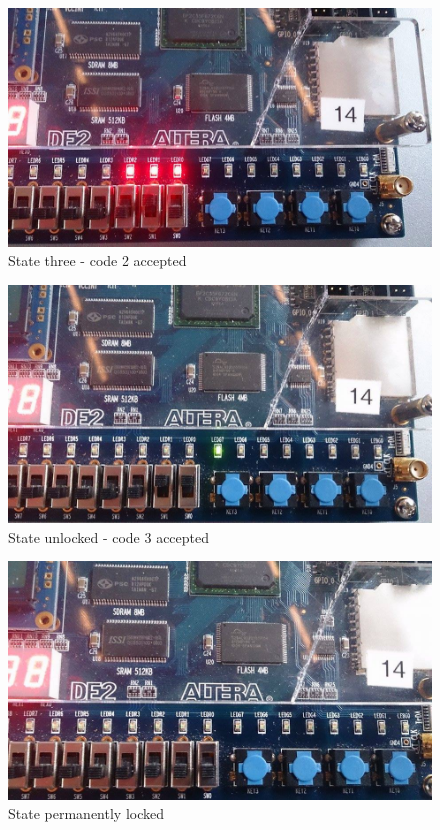 \begin{enumerate}
\begin{figure}[h]
	\centering
	\includegraphics[scale=0.45, angle =270]{pictures/Oevelse7/opg2/StateThree.JPG}
	\caption{State three - code 2 accepted}
	\label{fig:}
\end{figure}

\begin{figure}[h]
	\centering
	\includegraphics[scale=0.45, angle =270]{pictures/Oevelse7/opg2/StateUnlocked.JPG}
	\caption{State unlocked - code 3 accepted}
	\label{fig:}
\end{figure}

\begin{figure}[h]
	\centering
	\includegraphics[scale=0.45, angle =270]{pictures/Oevelse7/opg2/StatePermLocked.JPG}
	\caption{State permanently locked}
	\label{fig:}
\end{figure}

\end{enumerate}
	